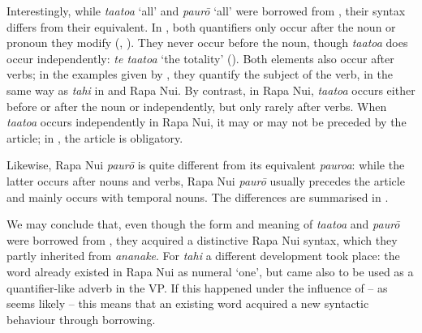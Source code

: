 Interestingly, while \textit{ta{\ꞌ}ato{\ꞌ}a} ‘all’ and \textit{paurō} ‘all’ were borrowed from , their syntax differs from their  equivalent. In , both quantifiers only occur after the noun or pronoun they modify (\citealt[172]{LazardPeltzer2000}, \citealt[148–149]{AcadémieTahitienne1986}). They never occur before the noun, though \textit{ta{\ꞌ}ato{\ꞌ}a} does occur independently: \textit{te ta{\ꞌ}ato{\ꞌ}a} ‘the totality’ (\citealt[149]{AcadémieTahitienne1986}). Both elements also occur after verbs; in the examples given by \citet[147]{LazardPeltzer2000}, they quantify the subject of the verb, in the same way as \textit{tahi} in  and Rapa Nui. By contrast, in Rapa Nui, \textit{ta{\ꞌ}ato{\ꞌ}a} occurs either before or after the noun or independently, but only rarely after verbs. When \textit{\mbox{ta{\ꞌ}ato{\ꞌ}a}} occurs independently in Rapa Nui, it may or may not be preceded by the article; in , the article is obligatory.

Likewise, Rapa Nui \textit{paurō} is quite different from its  equivalent \textit{pauroa}: while the latter occurs after nouns and verbs, Rapa Nui \textit{paurō} usually precedes the article and mainly occurs with temporal nouns. The differences are summarised in .

\begin{table}
\end{table}

We may conclude that, even though the form and meaning of \textit{ta{\ꞌ}ato{\ꞌ}a} and \textit{paurō} were borrowed from , they acquired a distinctive Rapa Nui syntax, which they partly inherited from \textit{ananake}. For \textit{tahi} a different development took place: the word already existed in Rapa Nui as numeral ‘one’, but came also to be used as a quantifier-like adverb in the VP. If this happened under the influence of  – as seems likely – this means that an existing word acquired a new syntactic behaviour through borrowing. 


